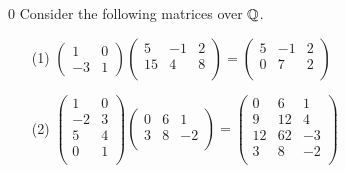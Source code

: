 \begin{example}
0   Consider the following matrices over $\mathbb{Q}$.		
        \begin{enumerate}
            \item[(1)] $\begin{pmatrix}
                         1 & 0 \\
                        -3 & 1 
                    \end{pmatrix}
                    \begin{pmatrix}
                         5 & -1 & 2 \\
                        15 &  4 & 8 \\  
                    \end{pmatrix}=
                    \begin{pmatrix}
                        5 & -1 & 2 \\
                        0 &  7 & 2 \\
                    \end{pmatrix}$

            \item[(2)] $\begin{pmatrix}
                         1 & 0 \\
                        -2 & 3 \\
                         5 & 4 \\
                         0 &1 \\
                    \end{pmatrix}
                    \begin{pmatrix}
                        0 & 6 &  1 \\
                        3 & 8 & -2 \\  
                    \end{pmatrix}=
                    \begin{pmatrix}
                         0 & 6 & 1 \\
                         9 & 12 &  4 \\
                        12 & 62 & -3 \\
                         3 &  8 & -2 \\
                    \end{pmatrix}$


\end{enumerate}
\end{example}
